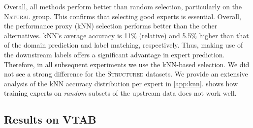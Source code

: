 \documentclass{article}
\begin{document}
Overall, all methods perform better than random selection, particularly on the 
\textsc{Natural} group. This confirms that selecting good experts is essential. Overall, the performance proxy (kNN) selection performs better than the other alternatives.
kNN's average accuracy is 11\% (relative) and 5.5\% higher than that of the domain prediction 
and label matching, respectively. 
Thus, making use of the downstream labels 
offers a significant advantage in expert prediction.
Therefore, in all subsequent experiments we use the kNN-based selection. 
We did not see a strong difference for the \textsc{Structured} datasets.
We provide an extensive analysis of the kNN accuracy distribution per expert in \cref{app:knn}.
 shows how training experts on \emph{random} subsets of the upstream data does not work well.



\vspace{-0.8em}
\subsection{Results on VTAB}
\label{subsec:experiments_architectures}
\end{document}
